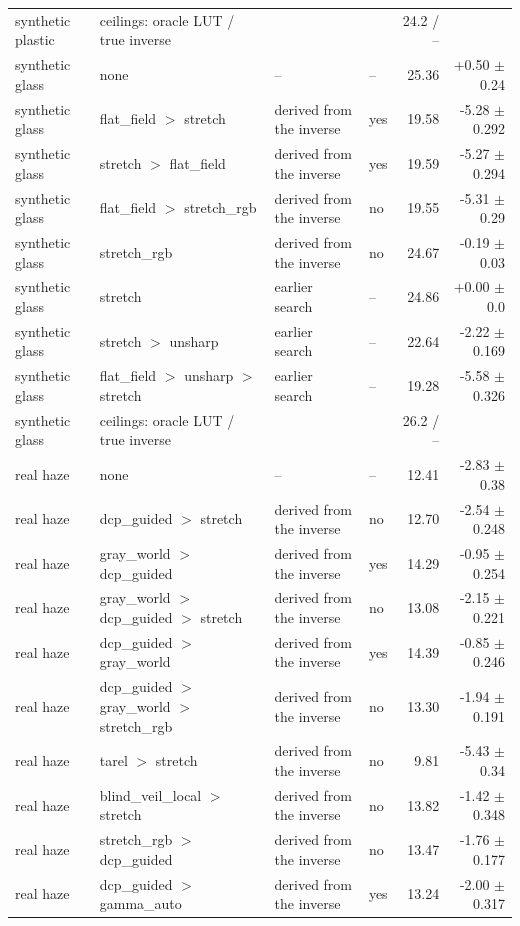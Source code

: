 \begin{longtable}{llllrr}
synthetic plastic & ceilings: oracle LUT / true inverse &  &  & 24.2 / -- &  \\
synthetic glass & none & -- & -- & 25.36 & +0.50 $\pm$ 0.24 \\
synthetic glass & flat\_field $>$ stretch & derived from the inverse & yes & 19.58 & -5.28 $\pm$ 0.292 \\
synthetic glass & stretch $>$ flat\_field & derived from the inverse & yes & 19.59 & -5.27 $\pm$ 0.294 \\
synthetic glass & flat\_field $>$ stretch\_rgb & derived from the inverse & no & 19.55 & -5.31 $\pm$ 0.29 \\
synthetic glass & stretch\_rgb & derived from the inverse & no & 24.67 & -0.19 $\pm$ 0.03 \\
synthetic glass & stretch & earlier search & -- & 24.86 & +0.00 $\pm$ 0.0 \\
synthetic glass & stretch $>$ unsharp & earlier search & -- & 22.64 & -2.22 $\pm$ 0.169 \\
synthetic glass & flat\_field $>$ unsharp $>$ stretch & earlier search & -- & 19.28 & -5.58 $\pm$ 0.326 \\
synthetic glass & ceilings: oracle LUT / true inverse &  &  & 26.2 / -- &  \\
real haze & none & -- & -- & 12.41 & -2.83 $\pm$ 0.38 \\
real haze & dcp\_guided $>$ stretch & derived from the inverse & no & 12.70 & -2.54 $\pm$ 0.248 \\
real haze & gray\_world $>$ dcp\_guided & derived from the inverse & yes & 14.29 & -0.95 $\pm$ 0.254 \\
real haze & gray\_world $>$ dcp\_guided $>$ stretch & derived from the inverse & no & 13.08 & -2.15 $\pm$ 0.221 \\
real haze & dcp\_guided $>$ gray\_world & derived from the inverse & yes & 14.39 & -0.85 $\pm$ 0.246 \\
real haze & dcp\_guided $>$ gray\_world $>$ stretch\_rgb & derived from the inverse & no & 13.30 & -1.94 $\pm$ 0.191 \\
real haze & tarel $>$ stretch & derived from the inverse & no & 9.81 & -5.43 $\pm$ 0.34 \\
real haze & blind\_veil\_local $>$ stretch & derived from the inverse & no & 13.82 & -1.42 $\pm$ 0.348 \\
real haze & stretch\_rgb $>$ dcp\_guided & derived from the inverse & no & 13.47 & -1.76 $\pm$ 0.177 \\
real haze & dcp\_guided $>$ gamma\_auto & derived from the inverse & yes & 13.24 & -2.00 $\pm$ 0.317 \\

\end{longtable}
